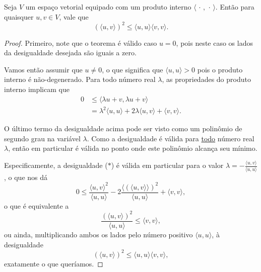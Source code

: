 \begin{theorem}
	Seja $V$ um espaço vetorial equipado com um produto interno $\langle\,\cdot\,,\,\cdot\,\rangle$. Então para quaisquer $u,v\in V$, vale que
	\[\left(\langle u,v\rangle\right)^2\leq\langle u,u\rangle\langle v,v\rangle.\]
\end{theorem}

\begin{proof}
	Primeiro, note que o teorema é válido caso $u=0$, pois neste caso os lados da desigualdade desejada são iguais a zero.
	
	Vamos então assumir que $u\neq 0$, o que significa que $\langle u,u\rangle>0$ pois o produto interno é não-degenerado. Para todo número real $\lambda$, as propriedades do produto interno implicam que
	\begin{align*}
	0
		&\leq  \langle \lambda u+v,\lambda u+v\rangle\\
		&=\lambda^2\langle u,u\rangle+2\lambda\langle u,v\rangle+\langle v,v\rangle.\tag{$*$}
	\end{align*}
	
	O último termo da desigualdade acima pode ser visto como um polinômio de segundo grau na variável $\lambda$. Como a desigualdade é válida para \uline{todo} número real $\lambda$, então em particular é válida no ponto onde este polinômio alcança seu mínimo.
	
	Especificamente, a desigualdade ($*$) é válida em particular para o valor $\lambda=-\frac{\langle u,v\rangle}{\langle u,u\rangle}$, o que nos dá
	\[0\leq\frac{\langle u,v\rangle^2}{\langle u,u\rangle}-2\frac{\langle(\langle u,v\rangle\rangle)^2}{\langle u,u\rangle}+\langle v,v\rangle,\]
	o que é equivalente a
	\[\frac{(\langle u,v\rangle)^2}{\langle u,u\rangle}\leq\langle v,v\rangle,\]
	ou ainda, multiplicando ambos os lados pelo número positivo $\langle u,u\rangle$, à desigualdade
	\[\left(\langle u,v\rangle\right)^2\leq\langle u,u\rangle\langle v,v\rangle,\]
	exatamente o que queríamos.
\end{proof}